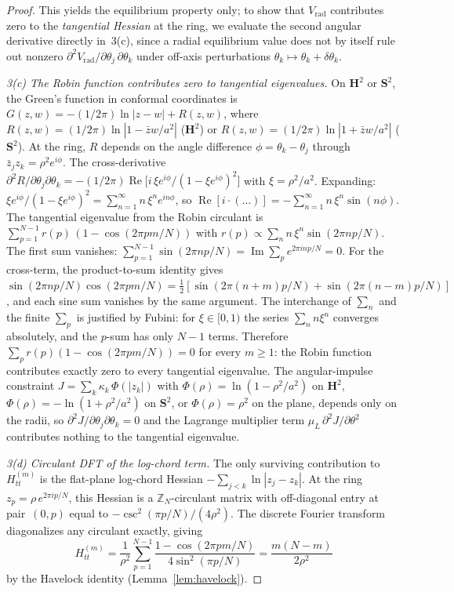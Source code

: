 \begin{proof}
This yields the equilibrium property only; to show that
$V_{\mathrm{rad}}$ contributes zero to the \emph{tangential
Hessian} at the ring, we evaluate the second angular
derivative directly in~3(c), since a radial equilibrium
value does not by itself rule out nonzero
$\partial^2 V_{\mathrm{rad}}/\partial \theta_j\,
\partial\theta_k$ under off-axis perturbations
$\theta_k \mapsto \theta_k + \delta\theta_k$.

\emph{3(c) The Robin function contributes zero to tangential eigenvalues.}
On $\mathbf{H}^2$ or $\mathbf{S}^2$, the Green's function
in conformal coordinates is
$G(z,w) = -(1/2\pi)\ln|z{-}w| + R(z,w)$,
where $R(z,w) = (1/2\pi)\ln|1 - \bar z w/a^2|$ ($\mathbf{H}^2$)
or $R(z,w) = (1/2\pi)\ln|1 + \bar z w/a^2|$ ($\mathbf{S}^2$).
At the ring, $R$ depends on the angle difference
$\phi = \theta_k - \theta_j$ through
$\bar z_j z_k = \rho^2 e^{i\phi}$.
The cross-derivative
$\partial^2 R/\partial\theta_j\partial\theta_k
= -(1/2\pi)\operatorname{Re}\!\bigl[
  i\,\xi e^{i\phi}/(1 - \xi e^{i\phi})^2\bigr]$
with $\xi = \rho^2/a^2$.
Expanding: $\xi e^{i\phi}/(1 - \xi e^{i\phi})^2
= \sum_{n=1}^\infty n\,\xi^n e^{in\phi}$,
so
$\operatorname{Re}[i \cdot (\ldots)]
= -\sum_{n=1}^\infty n\,\xi^n \sin(n\phi)$.
The tangential eigenvalue from the Robin circulant is
$\sum_{p=1}^{N-1} r(p)\,(1 - \cos(2\pi pm/N))$
with $r(p) \propto \sum_n n\,\xi^n \sin(2\pi np/N)$.
The first sum vanishes:
$\sum_{p=1}^{N-1} \sin(2\pi np/N)
= \operatorname{Im}\!\sum_p e^{2\pi inp/N} = 0$.
For the cross-term, the product-to-sum identity gives
$\sin(2\pi np/N)\cos(2\pi pm/N)
= \tfrac{1}{2}[\sin(2\pi(n{+}m)p/N)
+ \sin(2\pi(n{-}m)p/N)]$,
and each sine sum vanishes by the same argument.
The interchange of $\sum_n$ and the finite $\sum_p$ is
justified by Fubini: for $\xi \in [0,1)$ the series
$\sum_n n\xi^n$ converges absolutely, and the $p$-sum
has only $N-1$ terms.
Therefore $\sum_p r(p)(1 - \cos(2\pi pm/N)) = 0$
for every $m \ge 1$: the Robin function contributes
exactly zero to every tangential eigenvalue.
The angular-impulse constraint
$J = \sum_k \kappa_k\,\Phi(|z_k|)$ with
$\Phi(\rho) = \ln(1-\rho^2/a^2)$ on $\mathbf{H}^2$,
$\Phi(\rho) = -\ln(1+\rho^2/a^2)$ on $\mathbf{S}^2$,
or $\Phi(\rho) = \rho^2$ on the plane,
depends only on the radii, so
$\partial^2 J/\partial\theta_j\partial\theta_k = 0$
and the Lagrange multiplier term
$\mu_L\,\partial^2 J/\partial\theta^2$
contributes nothing to the tangential eigenvalue.

\emph{3(d) Circulant DFT of the log-chord term.}
The only surviving contribution to $H_{tt}^{(m)}$ is the
flat-plane log-chord Hessian $-\sum_{j<k}\ln|z_j - z_k|$.
At the ring $z_p = \rho\,e^{2\pi i p/N}$, this Hessian is a
$\mathbb{Z}_N$-circulant matrix with off-diagonal entry
at pair~$(0,p)$ equal to $-\csc^2(\pi p/N)/(4\rho^2)$.
The discrete Fourier transform diagonalizes any circulant
exactly, giving
\[
  H_{tt}^{(m)}
  = \frac{1}{\rho^2}\sum_{p=1}^{N-1}
    \frac{1-\cos(2\pi pm/N)}{4\sin^2(\pi p/N)}
  = \frac{m(N{-}m)}{2\rho^2}
\]
by the Havelock identity (Lemma~\ref{lem:havelock}).


\end{proof}

